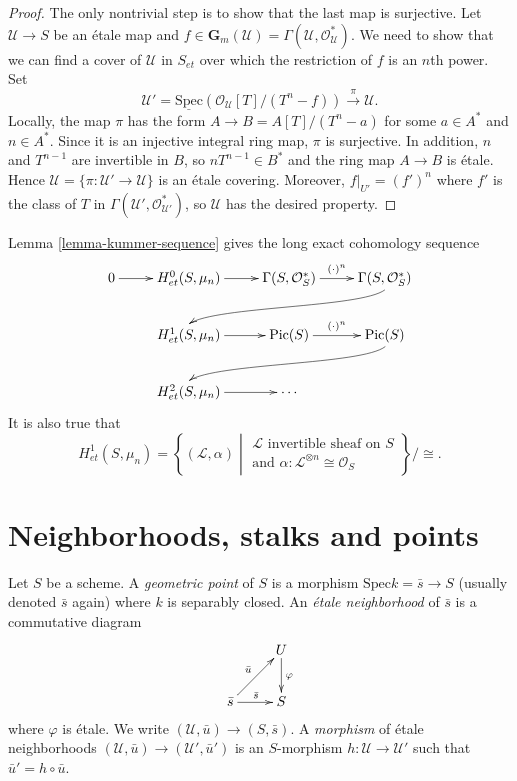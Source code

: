 \begin{proof}
The only nontrivial step is to show that the last map is surjective. Let
$\mathcal{U} \to S$ be an \'etale map and $f \in \mathbf{G}_m(\mathcal{U}) =
\Gamma(\mathcal{U}, \mathcal{O}_\mathcal{U}^*)$. We need to show that we can
find a cover of $\mathcal{U}$ in $S_{et}$ over which the restriction of $f$ is
an $n$th power. Set
$$
\mathcal{U}' = \underline{\text{Spec}} (\mathcal{O}_\mathcal{U}[T] / (T^n-f))
\xrightarrow{\pi} \mathcal{U}.
$$
Locally, the map $\pi$ has the form $A \to B = A[T] / (T^n-a)$ for some $a \in
A^*$ and $n \in A^*$. Since it is an injective integral ring map, $\pi$ is
surjective. In addition, $n$ and $T^{n-1}$ are invertible in $B$, so $nT^{n-1}
\in B^*$ and the ring map $A \to B$ is \'etale. Hence $\mathcal{U} = \{\pi :
\mathcal{U}' \to \mathcal{U}\}$ is an \'etale covering. Moreover, $f|_{U'} =
(f')^n$ where $f'$ is the class of $T$ in $\Gamma(\mathcal{U}',
\mathcal{O}_{\mathcal{U}'}^*)$, so $\mathcal{U}$ has the desired property.
\end{proof}

\noindent
Lemma \ref{lemma-kummer-sequence} gives the long exact cohomology sequence
$$
\xymatrix{
0 \ar[r] & H_{et}^0(S, \mu_n) \ar[r] & \Gamma(S, \mathcal{O}_S^*)
\ar^{(\cdot)^n}[r] & \Gamma(S, \mathcal{O}_S^*)
\ar@(rd,ul)[rdllllr]
\\
& H_{et}^1(S, \mu_n) \ar[r] & \text{Pic}(S) \ar^{(\cdot)^n}[r] & \text{Pic} (S)
\ar@(rd,ul)[rdllllr] \\
& H_{et}^2(S, \mu_n) \ar[r] & \cdots
}
$$
It is also true that
$$
H_{et}^1(S, \mu_n) = \left\{(\mathcal{L}, \alpha)\;
\left| \;
\begin{matrix}
\mathcal{L}\text{ invertible sheaf on } S \\
\text{and }\alpha: \mathcal{L}^{\otimes n} \cong \mathcal{O}_S
\end{matrix}
\right.
\right\}
\Big/\cong.
$$




\section{Neighborhoods, stalks and points}
\label{section-stalks}

\begin{definition}
\label{definition-geometric-point}
Let $S$ be a scheme. A {\it geometric point} of $S$ is a morphism $\text{Spec}
k = \bar s \to S$ (usually denoted $\bar s$ again) where $k$ is separably
closed. An {\it \'etale neighborhood} of $\bar s$ is a commutative diagram
$$
\xymatrix{
& U \ar^{\varphi}[d] \\
{\bar s} \ar^{\bar s}[r] \ar^{\bar u}[ur] & S
}
$$
where $\varphi$ is \'etale. We write $(\mathcal{U}, \bar u)\to (S, \bar s)$. A
{\it morphism} of \'etale neighborhoods $(\mathcal{U}, \bar u)\to
(\mathcal{U}',\bar u')$ is an $S$-morphism $h: \mathcal{U}\to \mathcal{U}'$
such that $\bar u'=h\circ\bar u$.
\end{definition}

